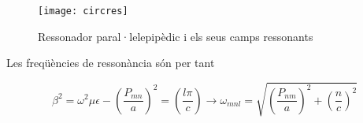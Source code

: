 \begin{figure}[ht]
  \centering
  \texttt{[image: circres]}
  \caption{Ressonador paral·lelepipèdic i els seus camps ressonants }
  \label{circres}
\end{figure}

Les freqüències de ressonància són per tant 

\begin{equation}
  \beta ^2 = \omega ^2 \mu \epsilon - \left ( \frac{P_{mn}}{a} \right ) ^2 = \left ( \frac{l\pi}{c} \right ) \to \omega _{mnl} = \sqrt{\left ( \frac{P_{nm}}{a} \right ) ^2 + \left ( \frac{n}{c} \right ) ^2 }
\end{equation}
